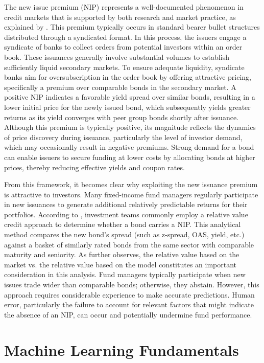 The new issue premium (NIP) represents a well-documented phenomenon in credit markets that is supported by both research and market practice, as explained by \parencite{Traczyk2024NewFactor}. This premium typically occurs in standard bearer bullet structures distributed through a syndicated format. In this process, the issuers engage a syndicate of banks to collect orders from potential investors within an order book. These issuances generally involve substantial volumes to establish sufficiently liquid secondary markets. To ensure adequate liquidity, syndicate banks aim for oversubscription in the order book by offering attractive pricing, specifically a premium over comparable bonds in the secondary market. A positive NIP indicates a favorable yield spread over similar bonds, resulting in a lower initial price for the newly issued bond, which subsequently yields greater returns as its yield converges with peer group bonds shortly after issuance. Although this premium is typically positive, its magnitude reflects the dynamics of price discovery during issuance, particularly the level of investor demand, which may occasionally result in negative premiums. Strong demand for a bond can enable issuers to secure funding at lower costs by allocating bonds at higher prices, thereby reducing effective yields and coupon rates.

From this framework, it becomes clear why exploiting the new issuance premium is attractive to investors. Many fixed-income fund managers regularly participate in new issuances to generate additional relatively predictable returns for their portfolios. According to \textcite[chap. 35]{Fabozzi2021TheEdition}, investment teams commonly employ a relative value credit approach to determine whether a bond carries a NIP. This analytical method compares the new bond's spread (such as z-spread, OAS, yield, etc.) against a basket of similarly rated bonds from the same sector with comparable maturity and seniority. As \textcite{Fabozzi2021TheEdition} further observes, the relative value based on the market vs. the relative value based on the model constitutes an important consideration in this analysis. Fund managers typically participate when new issues trade wider than comparable bonds; otherwise, they abstain. However, this approach requires considerable experience to make accurate predictions. Human error, particularly the failure to account for relevant factors that might indicate the absence of an NIP, can occur and potentially undermine fund performance.

\section{Machine Learning Fundamentals}

